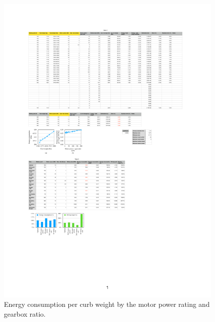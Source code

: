 \documentclass[journal]{IEEEtran}
\begin{document}
\begin{figure}
\centering
\includegraphics[width=1.0\hsize]{Figures/E_generic.pdf}
\caption{Energy consumption per curb weight by the motor power rating and gearbox ratio.}
\label{fig:E_generic}
\end{figure}
\end{document}
